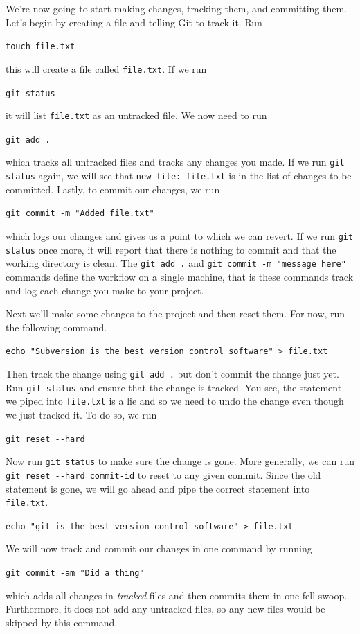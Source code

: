 \documentclass[notitlepage]{simple}
\begin{document}
We're now going to start making changes, tracking them, and committing them.
Let's begin by creating a file and telling Git to track it.
Run
\begin{terminal}
	\verb|touch file.txt|
\end{terminal}
this will create a file called \verb|file.txt|.
If we run
\begin{terminal}
	\verb|git status|
\end{terminal}
it will list \verb|file.txt| as an untracked file.
We now need to run
\begin{terminal}
	\verb|git add .|
\end{terminal}
which tracks all untracked files and tracks any changes you made.
If we run \verb|git status| again, we will see that \verb|new file: file.txt| is in the list of changes to be committed.
Lastly, to commit our changes, we run
\begin{terminal}
	\verb|git commit -m "Added file.txt"|
\end{terminal}
which logs our changes and gives us a point to which we can revert.
If we run \verb|git status| once more, it will report that there is nothing to commit and that the working directory is clean.
The \verb|git add .| and \verb|git commit -m "message here"| commands define the workflow on a single machine, that is these commands track and log each change you make to your project.

Next we'll make some changes to the project and then reset them.
For now, run the following command.
\begin{terminal}
	\verb|echo "Subversion is the best version control software" > file.txt|
\end{terminal}
Then track the change using \verb|git add .| but don't commit the change just yet.
Run \verb|git status| and ensure that the change is tracked.
You see, the statement we piped into \verb|file.txt| is a lie and so we need to undo the change even though we just tracked it.
To do so, we run
\begin{terminal}
	\verb|git reset --hard|
\end{terminal}
Now run \verb|git status| to make sure the change is gone.
More generally, we can run \verb|git reset --hard commit-id| to reset to any given commit.
Since the old statement is gone, we will go ahead and pipe the correct statement into \verb|file.txt|.
\begin{terminal}
	\verb|echo "git is the best version control software" > file.txt|
\end{terminal}
We will now track and commit our changes in one command by running
\begin{terminal}
	\verb|git commit -am "Did a thing"|
\end{terminal}
which adds all changes in \textit{tracked} files and then commits them in one fell swoop.
Furthermore, it does not add any untracked files, so any new files would be skipped by this command.
\end{document}
